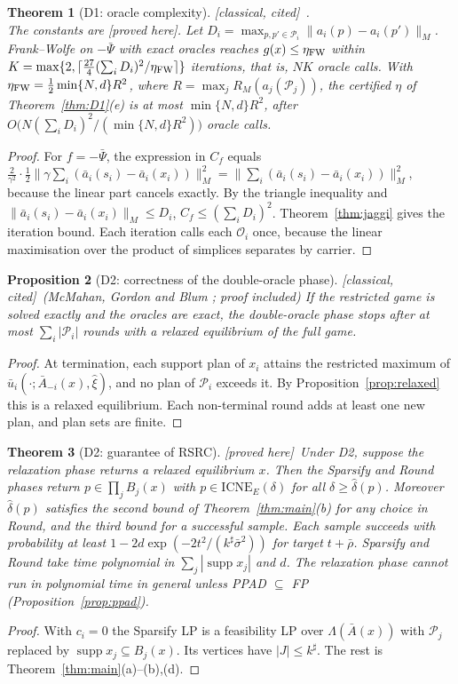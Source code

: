 \documentclass[11pt]{article}
\newtheorem{theorem}{Theorem}[section]
\newtheorem{proposition}[theorem]{Proposition}
\theoremstyle{definition}
\theoremstyle{remark}
\newcommand{\cP}{\mathcal{P}}
\newcommand{\ub}{\bar u}
\newcommand{\abar}{\bar a}
\newcommand{\Abar}{\bar A}
\newcommand{\supp}{\operatorname{supp}}
\newcommand{\ICNE}{\mathrm{ICNE}}
\newcommand{\PROVED}{\textsf{[proved here]}}
\newcommand{\CLASSICAL}{\textsf{[classical, cited]}}
\begin{document}
\begin{theorem}[D1: oracle complexity]\label{thm:fw} \CLASSICAL\ \cite{Jaggi13}.\\ The constants are \PROVED.
Let $D_i=\max_{p,p'\in\cP_i}\|a_i(p)-a_i(p')\|_M$. Frank--Wolfe on $-\bar\Psi$ with exact oracles reaches $g(x)\le\eta_{\rm FW}$ within $K=\max\{2,\lceil\frac{27}{4}(\sum_iD_i)^2/\eta_{\rm FW}\rceil\}$ iterations, that is, $NK$ oracle calls. With $\eta_{\rm FW}=\tfrac12\min\{N,d\}R^2$, where $R=\max_jR_M(a_j(\cP_j))$, the certified $\eta$ of Theorem~\ref{thm:D1}(e) is at most $\min\{N,d\}R^2$, after $O\big(N(\sum_iD_i)^2/(\min\{N,d\}R^2)\big)$ oracle calls.
\end{theorem}
\begin{proof}
For $f=-\bar\Psi$, the expression in $C_f$ equals $\frac{2}{\gamma^2}\cdot\frac12\|\gamma\sum_i(\abar_i(s_i)-\abar_i(x_i))\|^2_M=\|\sum_i(\abar_i(s_i)-\abar_i(x_i))\|_M^2$, because the linear part cancels exactly. By the triangle inequality and $\|\abar_i(s_i)-\abar_i(x_i)\|_M\le D_i$, $C_f\le(\sum_iD_i)^2$. Theorem~\ref{thm:jaggi} gives the iteration bound. Each iteration calls each $\mathcal O_i$ once, because the linear maximisation over the product of simplices separates by carrier.
\end{proof}

\begin{proposition}[D2: correctness of the double-oracle phase]\label{prop:do} \CLASSICAL\ (McMahan, Gordon and Blum \cite{MGB03}; proof included)
If the restricted game is solved exactly and the oracles are exact, the double-oracle phase stops after at most $\sum_i|\cP_i|$ rounds with a relaxed equilibrium of the full game.
\end{proposition}
\begin{proof}
At termination, each support plan of $x_i$ attains the restricted maximum of $\ub_i(\cdot;\Abar_{-i}(x),\hat\xi)$, and no plan of $\cP_i$ exceeds it. By Proposition~\ref{prop:relaxed} this is a relaxed equilibrium. Each non-terminal round adds at least one new plan, and plan sets are finite.
\end{proof}

\begin{theorem}[D2: guarantee of RSRC]\label{thm:D2} \PROVED\
Under D2, suppose the relaxation phase returns a relaxed equilibrium $x$. Then the Sparsify and Round phases return $p\in\prod_jB_j(x)$ with $p\in\ICNE_E(\delta)$ for all $\delta\ge\hat\delta(p)$. Moreover $\hat\delta(p)$ satisfies the second bound of Theorem~\ref{thm:main}(b) for any choice in Round, and the third bound for a successful sample. Each sample succeeds with probability at least $1-2d\exp(-2t^2/(k^\sharp\bar\sigma^2))$ for target $t+\bar\rho$. Sparsify and Round take time polynomial in $\sum_j|\supp x_j|$ and $d$. The relaxation phase cannot run in polynomial time in general unless PPAD $\subseteq$ FP (Proposition~\ref{prop:ppad}).
\end{theorem}
\begin{proof}
With $c_i=0$ the Sparsify LP is a feasibility LP over $\Lambda(\Abar(x))$ with $\cP_j$ replaced by $\supp x_j\subseteq B_j(x)$. Its vertices have $|J|\le k^\sharp$. The rest is Theorem~\ref{thm:main}(a)--(b),(d).
\end{proof}
\end{document}

